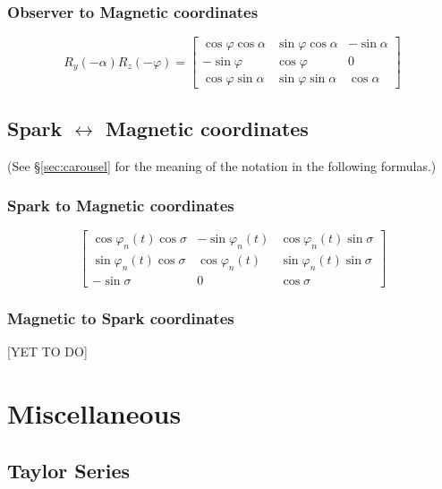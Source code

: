 \documentclass{book}
\newcommand{\phase}{\varphi}
\begin{document}
\subsection{Observer to Magnetic coordinates}
\begin{equation}
    R_y(-\alpha) R_z(-\phase) =
    \begin{bmatrix}
        \cos\phase\cos\alpha & \sin\phase\cos\alpha & -\sin\alpha \\
        -\sin\phase          & \cos\phase           & 0           \\
        \cos\phase\sin\alpha & \sin\phase\sin\alpha &  \cos\alpha
    \end{bmatrix}
\end{equation}

\section{Spark $\leftrightarrow$ Magnetic coordinates}

(See \S\ref{sec:carousel} for the meaning of the notation in the following formulas.)

\subsection{Spark to Magnetic coordinates}
\begin{equation}
    \begin{bmatrix}
        \cos\phase_n(t)\cos\sigma & -\sin\phase_n(t) & \cos\phase_n(t)\sin\sigma \\
        \sin\phase_n(t)\cos\sigma &  \cos\phase_n(t) & \sin\phase_n(t)\sin\sigma \\
        -\sin\sigma          & 0           & \cos\sigma
    \end{bmatrix}
\end{equation}

\subsection{Magnetic to Spark coordinates}

[YET TO DO]



\chapter{Miscellaneous}

\section{Taylor Series}
\end{document}
